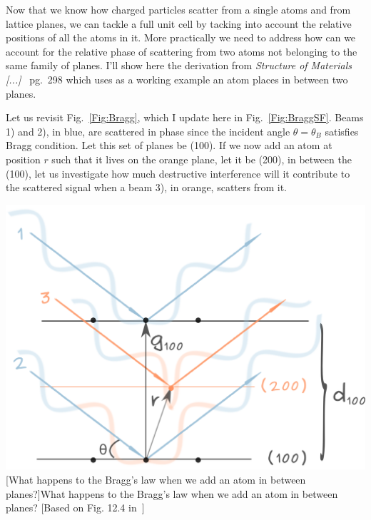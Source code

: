 Now that we know how charged particles scatter from a single atoms and from lattice planes, we can tackle a full unit cell by tacking into account the relative positions of all the atoms in it. More practically we need to address how can we account for the relative phase of scattering from two atoms not belonging to the same family of planes. I'll show here the derivation from \textit{Structure of Materials [...]}~\cite{SoM} pg.~298 which uses as a working example an atom places in between two planes. 


\noindent \begin{minipage}{0.43\textwidth}
Let us revisit Fig.~\ref{Fig:Bragg}, which I update here in Fig.~\ref{Fig:BraggSF}. Beams 1) and 2), in blue, are scattered in phase since the incident angle $\theta = \theta_B$ satisfies Bragg condition. Let this set of planes be \hkl(100). If we now add an atom at position $r$ such that it lives on the orange plane, let it be \hkl(200), in between the \hkl(100),  let us investigate how much destructive interference will it contribute to the scattered signal when a beam 3), in orange, scatters from it.
\end{minipage} %
\begin{minipage}{0.6\textwidth}
\centering
\includegraphics[width=0.87\linewidth]{Figures/BraggSF.png}
[What happens to the Bragg's law when we add an atom in between planes?]{What happens to the Bragg's law when we add an atom in between planes? [Based on Fig. 12.4 in~\cite{SoM}]}
\label{Fig:BraggSF}
\end{minipage}

\vspace{0.3cm}

